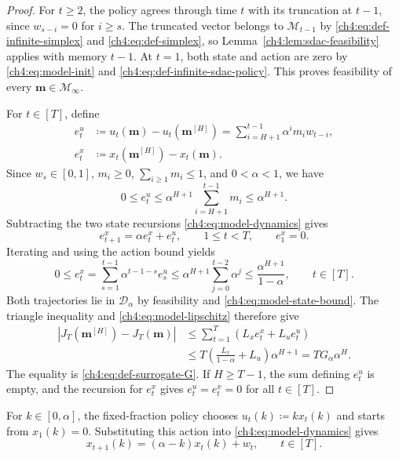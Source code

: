 \begin{proof}
For $t\ge2$, the policy agrees through time $t$ with its truncation at $t-1$,
since $w_{s-i}=0$ for $i\ge s$. The truncated vector belongs to
$\mathcal M_{t-1}$ by \eqref{ch4:eq:def-infinite-simplex} and
\eqref{ch4:eq:def-simplex}, so Lemma~\ref{ch4:lem:sdac-feasibility}
applies with memory $t-1$. At $t=1$, both state and action are zero by
\eqref{ch4:eq:model-init} and \eqref{ch4:eq:def-infinite-sdac-policy}.
This proves feasibility of every $\mathbf m\in\mathcal M_\infty$.

For $t\in[T]$, define
\begin{equation}
\label{ch4:eq:sdac-truncation-gaps}
\begin{aligned}
e_t^u&\coloneqq u_t(\mathbf m)-u_t(\mathbf m^{[H]})
       =\sum_{i=H+1}^{t-1}\alpha^im_iw_{t-i},\\
e_t^x&\coloneqq x_t(\mathbf m^{[H]})-x_t(\mathbf m).
\end{aligned}
\end{equation}
Since $w_s\in[0,1]$, $m_i\ge0$, $\sum_{i\ge1}m_i\le1$, and
$0<\alpha<1$, we have
\[
0\le e_t^u\le\alpha^{H+1}\sum_{i=H+1}^{t-1}m_i
\le\alpha^{H+1}.
\]
Subtracting the two state recursions \eqref{ch4:eq:model-dynamics} gives
\begin{equation}
\label{ch4:eq:sdac-truncation-recursion}
e_{t+1}^x=\alpha e_t^x+e_t^u,\qquad 1\le t<T,\qquad e_1^x=0.
\end{equation}
Iterating and using the action bound yields
\begin{equation}
\label{ch4:eq:sdac-truncation-state-gap}
0\le e_t^x
=\sum_{s=1}^{t-1}\alpha^{t-1-s}e_s^u
\le\alpha^{H+1}\sum_{j=0}^{t-2}\alpha^j
\le\frac{\alpha^{H+1}}{1-\alpha},\qquad t\in[T].
\end{equation}
Both trajectories lie in $\mathcal D_\alpha$
by feasibility and \eqref{ch4:eq:model-state-bound}. The triangle
inequality and \eqref{ch4:eq:model-lipschitz} therefore give
\[
\begin{aligned}
|J_T(\mathbf m^{[H]})-J_T(\mathbf m)|
&\le\sum_{t=1}^T(L_xe_t^x+L_ue_t^u)\\
&\le T\left(\frac{L_x}{1-\alpha}+L_u\right)\alpha^{H+1}
=TG_\alpha\alpha^H.
\end{aligned}
\]
The equality is \eqref{ch4:eq:def-surrogate-G}.
If $H\ge T-1$, the sum defining $e_t^u$ is empty, and the recursion for
$e_t^x$ gives $e_t^u=e_t^x=0$ for all $t\in[T]$.
\end{proof}

For $k\in[0,\alpha]$, the fixed-fraction policy chooses $u_t(k)\coloneqq kx_t(k)$
and starts from $x_1(k)=0$. Substituting this action into
\eqref{ch4:eq:model-dynamics} gives
\begin{equation}
\label{ch4:eq:fixed-fraction-dynamics}
x_{t+1}(k)=(\alpha-k)x_t(k)+w_t,\qquad t\in[T].
\end{equation}

